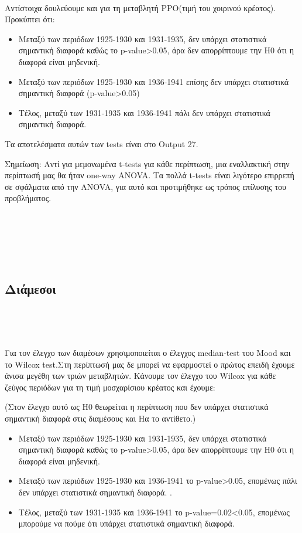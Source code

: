 \documentclass[10pt]{article}
\begin{document}
\


Αντίστοιχα δουλεύουμε και για τη μεταβλητή PPO(τιμή του χοιρινού κρέατος). Προκύπτει ότι:

\begin{itemize}
    \item Μεταξύ των περιόδων 1925-1930 και 1931-1935, δεν υπάρχει στατιστικά σημαντική διαφορά καθώς το p-value>0.05, άρα δεν απορρίπτουμε την Η0 ότι η διαφορά είναι μηδενική.
    \item Μεταξύ των περιόδων 1925-1930 και 1936-1941 επίσης δεν υπάρχει στατιστικά σημαντική διαφορά (p-value>0.05)
    \item Τέλος, μεταξύ των 1931-1935 και 1936-1941 πάλι δεν υπάρχει στατιστικά σημαντική διαφορά.
\end{itemize}

Τα αποτελέσματα αυτών των tests είναι στο Output 27.


Σημείωση: Αντί για μεμονωμένα t-tests για κάθε περίπτωση, μια εναλλακτική στην περίπτωσή μας θα ήταν one-way ANOVA. Τα πολλά t-tests είναι λιγότερο επιρρεπή σε σφάλματα από την ANOVA, για αυτό και προτιμήθηκε ως τρόπος επίλυσης του προβλήματος.


\

\ 

\
\subsection{Διάμεσοι}

\

\


Για τον έλεγχο των διαμέσων χρησιμοποιείται ο έλεγχος median-test του Mood και το Wilcox test.Στη περίπτωσή μας δε μπορεί να εφαρμοστεί ο πρώτος επειδή έχουμε άνισα μεγέθη των τριών μεταβλητών. Κάνουμε τον έλεγχο του Wilcox για κάθε ζεύγος περιόδων για τη τιμή μοσχαρίσιου κρέατος και έχουμε:

(Στον έλεγχο αυτό ως Η0 θεωρείται η περίπτωση που δεν υπάρχει στατιστικά σημαντική διαφορά στις διαμέσους και Ηα το αντίθετο.)

\begin{itemize}
    \item Μεταξύ των περιόδων 1925-1930 και 1931-1935, δεν υπάρχει στατιστικά σημαντική διαφορά καθώς το p-value>0.05, άρα δεν απορρίπτουμε την Η0 ότι η διαφορά είναι μηδενική.
    \item Μεταξύ των περιόδων 1925-1930 και 1936-1941 το p-value>0.05, επομένως πάλι δεν υπάρχει στατιστικά σημαντική διαφορά. .
    \item Τέλος, μεταξύ των 1931-1935 και 1936-1941 το p-value=0.02<0.05, επομένως μπορούμε να πούμε ότι υπάρχει στατιστικά σημαντική διαφορά.
\end{itemize}
\end{document}
